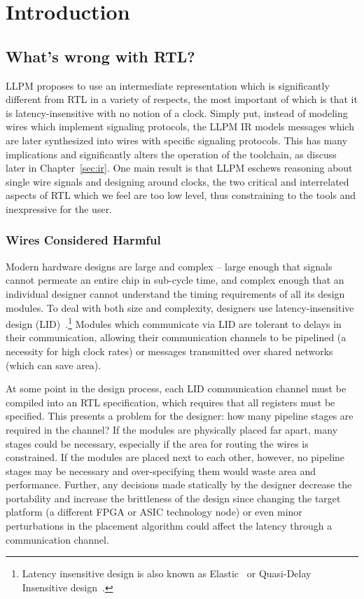 
\chapter{Introduction}
\label{sec:intro}


\section{What's wrong with RTL?}
LLPM proposes to use an intermediate representation which is significantly
different from RTL in a variety of respects, the most important of which is
that it is latency-insensitive with no notion of a clock. Simply put, instead
of modeling wires which implement signaling protocols, the LLPM IR models
messages which are later synthesized into wires with specific signaling
protocols. This has many implications and significantly alters the operation
of the toolchain, as discuss later in Chapter~\ref{sec:ir}. One main result is
that LLPM eschews reasoning about single wire signals and designing around
clocks, the two critical and interrelated aspects of RTL which we feel are too
low level, thus constraining to the tools and inexpressive for the user.

\subsection{Wires Considered Harmful}
Modern hardware designs are large and complex -- large enough that signals
cannot permeate an entire chip in sub-cycle time, and complex enough that an
individual designer cannot understand the timing requirements of all its
design modules. To deal with both size and complexity, designers use
latency-insensitive design (LID)~\cite{Carloni2001}.\footnote{Latency
insensitive design is also known as Elastic~\cite{Cortadella2010} or
Quasi-Delay Insensitive design~\cite{Hauck1995,Martin1990}.} Modules which
communicate via LID are tolerant to delays in their communication, allowing
their communication channels to be pipelined (a necessity for high clock
rates) or messages transmitted over shared networks (which can save area).

At some point in the design process, each LID communication channel must be
compiled into an RTL specification, which requires that all registers must be
specified. This presents a problem for the designer: how many pipeline stages
are required in the channel? If the modules are physically placed far apart,
many stages could be necessary, especially if the area for routing the wires
is constrained. If the modules are placed next to each other, however, no
pipeline stages may be necessary and over-specifying them would waste area and
performance. Further, any decisions made statically by the designer decrease
the portability and increase the brittleness of the design since changing the
target platform (a different FPGA or ASIC technology node) or even minor
perturbations in the placement algorithm could affect the latency through a
communication channel.

